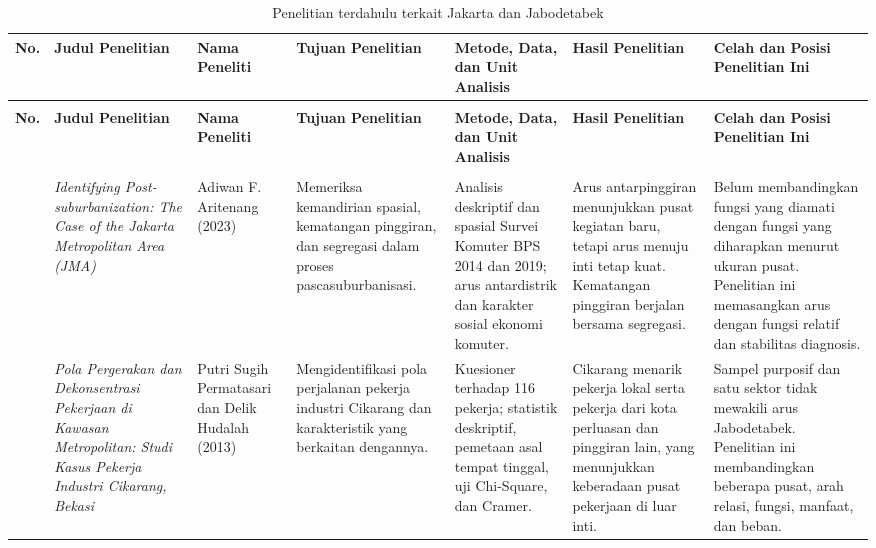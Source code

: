 \documentclass[12pt,a4paper,oneside,openany,indonesian]{report}
\begin{document}
\clearpage
\begin{landscape}
\footnotesize
\setlength{\tabcolsep}{2.2pt}
\renewcommand{\arraystretch}{1.18}
\begin{longtable}{>{\centering\arraybackslash}p{0.55cm}p{3.4cm}p{3.0cm}p{3.6cm}p{3.9cm}p{4.0cm}p{4.5cm}}
\caption{Penelitian terdahulu terkait Jakarta dan Jabodetabek}\label{tab:penelitian-terdahulu}\\
\toprule
\textbf{No.} & \textbf{Judul Penelitian} & \textbf{Nama Peneliti} & \textbf{Tujuan Penelitian} & \textbf{Metode, Data, dan Unit Analisis} & \textbf{Hasil Penelitian} & \textbf{Celah dan Posisi Penelitian Ini}\\
\midrule
\endfirsthead
\multicolumn{7}{l}{\textit{Lanjutan Tabel \thetable}}\\
\toprule
\textbf{No.} & \textbf{Judul Penelitian} & \textbf{Nama Peneliti} & \textbf{Tujuan Penelitian} & \textbf{Metode, Data, dan Unit Analisis} & \textbf{Hasil Penelitian} & \textbf{Celah dan Posisi Penelitian Ini}\\
\midrule
\endhead
\midrule
\multicolumn{7}{r}{\textit{Bersambung ke halaman berikutnya}}\\
\endfoot
\bottomrule
\endlastfoot
1 & \textit{Identifying Post-suburbanization: The Case of the Jakarta Metropolitan Area (JMA)} & Adiwan F. Aritenang (2023) & Memeriksa kemandirian spasial, kematangan pinggiran, dan segregasi dalam proses pascasuburbanisasi. & Analisis deskriptif dan spasial Survei Komuter BPS 2014 dan 2019; arus antardistrik dan karakter sosial ekonomi komuter. & Arus antarpinggiran menunjukkan pusat kegiatan baru, tetapi arus menuju inti tetap kuat. Kematangan pinggiran berjalan bersama segregasi. & Belum membandingkan fungsi yang diamati dengan fungsi yang diharapkan menurut ukuran pusat. Penelitian ini memasangkan arus dengan fungsi relatif dan stabilitas diagnosis.\\
2 & \textit{Pola Pergerakan dan Dekonsentrasi Pekerjaan di Kawasan Metropolitan: Studi Kasus Pekerja Industri Cikarang, Bekasi} & Putri Sugih Permatasari dan Delik Hudalah (2013) & Mengidentifikasi pola perjalanan pekerja industri Cikarang dan karakteristik yang berkaitan dengannya. & Kuesioner terhadap 116 pekerja; statistik deskriptif, pemetaan asal tempat tinggal, uji Chi-Square, dan Cramer. & Cikarang menarik pekerja lokal serta pekerja dari kota perluasan dan pinggiran lain, yang menunjukkan keberadaan pusat pekerjaan di luar inti. & Sampel purposif dan satu sektor tidak mewakili arus Jabodetabek. Penelitian ini membandingkan beberapa pusat, arah relasi, fungsi, manfaat, dan beban.\\

\end{longtable}
\end{landscape}
\end{document}
